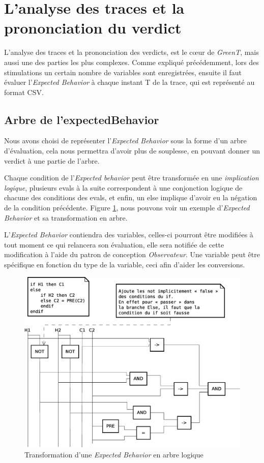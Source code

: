 \section{L'analyse des traces et la prononciation du verdict}
	L'analyse des traces et la prononciation des verdicts, est le c\oe{}ur de \textit{GreenT}, mais aussi une des parties les plus complexes. Comme expliqué précédemment, lors des stimulations un certain nombre de variables sont enregistrées, ensuite il faut évaluer l'\textit{Expected Behavior} à chaque instant T de la trace, qui est représenté au format CSV. 

	\subsection{Arbre de l'expectedBehavior}
 	Nous avons choisi de représenter l'\textit{Expected Behavior} sous la forme d'un arbre d'évaluation, cela nous permettra d'avoir plus de souplesse, en pouvant donner un verdict à une partie de l'arbre.

 	Chaque condition de l'\textit{Expected behavior} peut être transformée en une \textit{implication logique}, plusieurs evals à la suite correspondent à une conjonction logique de chacune des conditions des evals, et enfin, un else implique d'avoir eu la négation de la condition précédente. Figure \ref{fig:diagLogique}, nous pouvons voir un exemple d'\textit{Expected Behavior} et sa transformation en arbre.


L'\textit{Expected Behavior} contiendra des variables, celles-ci pourront être modifiées à tout moment ce qui relancera son évaluation, elle sera notifiée de cette modification à l'aide du patron de conception \textit{Observateur}. Une variable peut être spécifique en fonction du type de la variable, ceci afin d'aider les conversions.

 	\begin{figure}[H]
 		\centering
 		\includegraphics[width=14cm]{contents/images/diagLogique.eps}
 		\caption{Transformation d'une \textit{Expected Behavior} en arbre logique}
 		\label{fig:diagLogique}
 	\end{figure}

